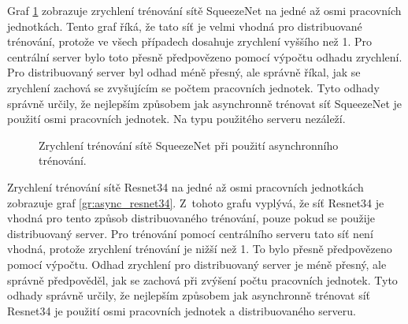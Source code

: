 Graf \ref{gr:async_squeezenet} zobrazuje zrychlení trénování sítě SqueezeNet na jedné až osmi pracovních jednotkách.
Tento graf říká, že tato síť je velmi vhodná pro distribuované trénování, protože ve všech případech dosahuje zrychlení vyššího než 1.
Pro centrální server bylo toto přesně předpovězeno pomocí výpočtu odhadu zrychlení.
Pro distribuovaný server byl odhad méně přesný, ale správně říkal, jak se zrychlení zachová se zvyšujícím se počtem pracovních jednotek.
Tyto odhady správně určily, že nejlepším způsobem jak asynchronně trénovat síť SqueezeNet je použití osmi pracovních jednotek.
Na typu použitého serveru nezáleží.

\begin{figure}
\centering
{}
\caption{Zrychlení trénování sítě SqueezeNet při použití asynchronního trénování.}
\label{gr:async_squeezenet}
\end{figure}

Zrychlení trénování sítě Resnet34 na jedné až osmi pracovních jednotkách zobrazuje graf \ref{gr:async_resnet34}.
Z~tohoto grafu vyplývá, že síť Resnet34 je vhodná pro tento způsob distribuovaného trénování, pouze pokud se použije distribuovaný server.
Pro trénování pomocí centrálního serveru tato síť není vhodná, protože zrychlení trénování je nižší než 1.
To bylo přesně předpovězeno pomocí výpočtu.
Odhad zrychlení pro distribuovaný server je méně přesný, ale správně předpověděl, jak se zachová při zvýšení počtu pracovních jednotek.
Tyto odhady správně určily, že nejlepším způsobem jak asynchronně trénovat síť Resnet34 je použití osmi pracovních jednotek a distribuovaného serveru.

